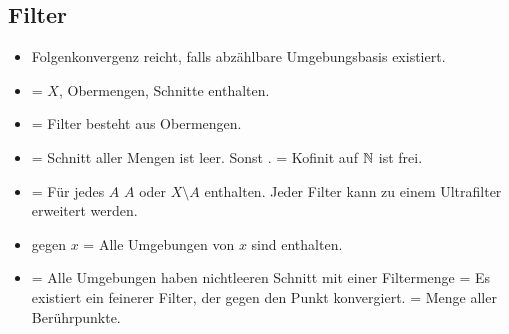 \documentclass[8pt]{extarticle}
\begin{document}
\subsection*{Filter}
\begin{itemize}
	\item Folgenkonvergenz reicht, falls abzählbare Umgebungsbasis existiert.
	\item {} = $X$, Obermengen, Schnitte enthalten.
	\item {} = Filter besteht aus Obermengen.
	\item {} = Schnitt aller Mengen ist leer. Sonst .  = Kofinit auf $\mathbb{N}$ ist frei.
	\item {} = Für jedes $A$ $A$ oder $X \setminus A$ enthalten. Jeder Filter kann zu einem Ultrafilter erweitert werden.
	\item {} gegen $x$  = Alle Umgebungen von $x$ sind enthalten. 
	\item {} = Alle Umgebungen haben nichtleeren Schnitt mit einer Filtermenge = Es existiert ein feinerer Filter, der gegen den Punkt konvergiert.  = Menge aller Berührpunkte.
\end{itemize}
\end{document}
